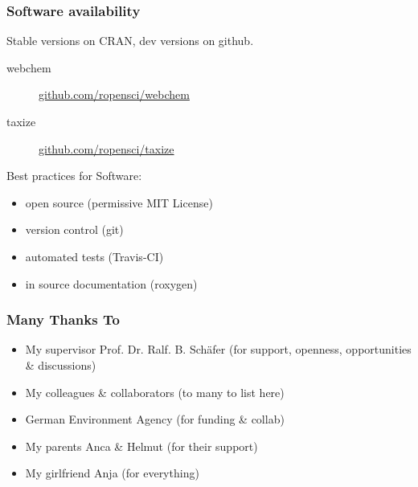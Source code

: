\documentclass[
	12pt
	]{beamer}
\begin{document}
{%
\begin{frame}
\frametitle{Software availability}
	Stable versions on CRAN, dev versions on github.
	\begin{description}
		\item[webchem]{\url{github.com/ropensci/webchem}}
		\item[taxize]{\url{github.com/ropensci/taxize}}
	\end{description}
	\vspace{1em}

Best practices for Software:
	\begin{itemize}
		\item open source (permissive MIT License)
		\item version control (git)
		\item automated tests (Travis-CI)
		\item in source documentation (roxygen)
	\end{itemize}
\end{frame}
}

\begin{frame}
\frametitle{Many Thanks To}
	\begin{itemize}
		\item My supervisor \alert{Prof. Dr. Ralf. B. Schäfer} (for support, openness, opportunities \& discussions)
		\item My \alert{colleagues \& collaborators} (to many to list here)
		\item \alert{{G}erman Environment Agency} (for funding \& collab)
		\item My parents \alert{Anca \& Helmut} (for their support)
		\item My girlfriend \alert{Anja} (for everything)
	\end{itemize}
\end{frame}


\end{document}
